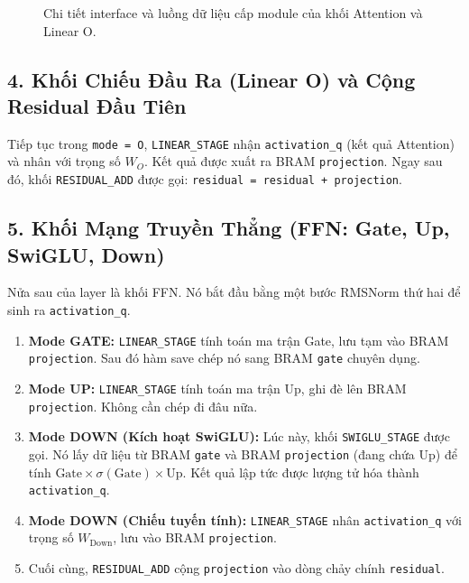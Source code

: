 \documentclass[12pt,a4paper]{article}
\begin{document}
\begin{figure}[H]
{
}
\caption{Chi tiết interface và luồng dữ liệu cấp module của khối Attention và Linear O.}
\end{figure}

\subsection{4. Khối Chiếu Đầu Ra (Linear O) và Cộng Residual Đầu Tiên}
Tiếp tục trong \texttt{mode = O}, \texttt{LINEAR\_STAGE} nhận \texttt{activation\_q} (kết quả Attention) và nhân với trọng số $W_O$. Kết quả được xuất ra BRAM \texttt{projection}.
Ngay sau đó, khối \texttt{RESIDUAL\_ADD} được gọi: \texttt{residual = residual + projection}.

\subsection{5. Khối Mạng Truyền Thẳng (FFN: Gate, Up, SwiGLU, Down)}

Nửa sau của layer là khối FFN. Nó bắt đầu bằng một bước RMSNorm thứ hai để sinh ra \texttt{activation\_q}.
\begin{enumerate}
    \item \textbf{Mode GATE:} \texttt{LINEAR\_STAGE} tính toán ma trận Gate, lưu tạm vào BRAM \texttt{projection}. Sau đó hàm save chép nó sang BRAM \texttt{gate} chuyên dụng.
    \item \textbf{Mode UP:} \texttt{LINEAR\_STAGE} tính toán ma trận Up, ghi đè lên BRAM \texttt{projection}. Không cần chép đi đâu nữa.
    \item \textbf{Mode DOWN (Kích hoạt SwiGLU):} Lúc này, khối \texttt{SWIGLU\_STAGE} được gọi. Nó lấy dữ liệu từ BRAM \texttt{gate} và BRAM \texttt{projection} (đang chứa Up) để tính $\text{Gate} \times \sigma(\text{Gate}) \times \text{Up}$. Kết quả lập tức được lượng tử hóa thành \texttt{activation\_q}.
    \item \textbf{Mode DOWN (Chiếu tuyến tính):} \texttt{LINEAR\_STAGE} nhân \texttt{activation\_q} với trọng số $W_{\text{Down}}$, lưu vào BRAM \texttt{projection}.
    \item Cuối cùng, \texttt{RESIDUAL\_ADD} cộng \texttt{projection} vào dòng chảy chính \texttt{residual}.
\end{enumerate}
\end{document}

